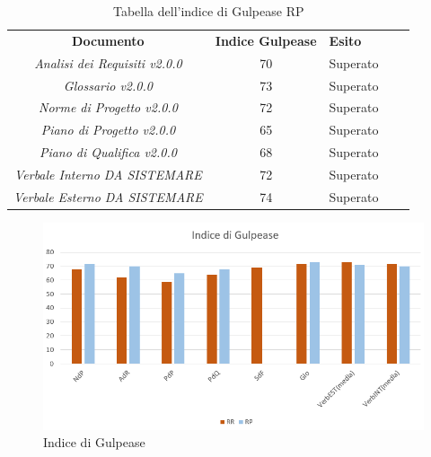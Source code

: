 \renewcommand{\arraystretch}{1.5}
\begin{longtable}{ c c  C{4cm}  c  c }
    \caption{Tabella dell'indice di Gulpease RP} \\
    \rowcolor{\primaryColor}
    \textcolor{\secondaryColor}{
    \centering\textbf{Documento}}     & \textcolor{\secondaryColor}{\centering\textbf{Indice Gulpease}}    & \textcolor{\secondaryColor}
    {\centering\textbf{Esito}} \\
    \textit{Analisi dei Requisiti v2.0.0}           & 70                                    & Superato{} \\
    \textit{Glossario v2.0.0}                       & 73                                    & Superato{} \\
    \textit{Norme di Progetto v2.0.0}               & 72                                   & Superato{} \\
    \textit{Piano di Progetto v2.0.0}                & 65                                    & Superato{} \\
    \textit{Piano di Qualifica v2.0.0}                & 68                                    & Superato{} \\
    \textit{Verbale Interno DA SISTEMARE}          & 72                                    & Superato{} \\
    \textit{Verbale Esterno DA SISTEMARE}          & 74                                    & Superato{} \\
    
\end{longtable}

\begin{figure}[H]
	\centering
	\includegraphics[scale=0.8]{src/ResocontoVerifica/src/img/indiceGulpease.png}
	\caption{Indice di Gulpease}
\end{figure}

